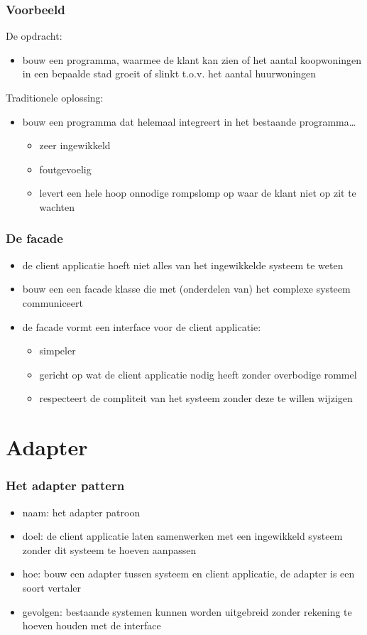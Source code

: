 \documentclass{beamer}
\begin{document}
\begin{frame} \frametitle{Voorbeeld}
  De opdracht:
  \begin{itemize}
  \item bouw een programma, waarmee de klant kan zien of het aantal koopwoningen in een bepaalde stad groeit of slinkt t.o.v. het aantal huurwoningen
  \end{itemize}
Traditionele oplossing:
\begin{itemize}
\item bouw een programma dat helemaal integreert in het bestaande programma\ldots
  \begin{itemize}
  \item zeer ingewikkeld
  \item foutgevoelig
  \item levert een hele hoop onnodige rompslomp op waar de klant niet op zit te wachten
  \end{itemize}
\end{itemize}
\end{frame}


\begin{frame} \frametitle{De facade}
  \begin{itemize}
\item de client applicatie hoeft niet alles van het ingewikkelde systeem te weten
\item bouw een een facade klasse die met (onderdelen van) het complexe systeem communiceert
\item de facade vormt een interface voor de client applicatie:
  \begin{itemize}
  \item simpeler
  \item gericht op wat de client applicatie nodig heeft zonder overbodige rommel
  \item respecteert de compliteit van het systeem zonder deze te willen wijzigen
  \end{itemize}
\end{itemize}
\end{frame}


\section{Adapter}


\begin{frame}[fragile]\frametitle{Het adapter pattern}
  \begin{itemize}
  \item naam: het adapter patroon
  \item doel: de client applicatie laten samenwerken met een ingewikkeld systeem zonder dit systeem te hoeven aanpassen
  \item hoe: bouw een adapter tussen systeem en client applicatie, de adapter is een soort vertaler
  \item gevolgen: bestaande systemen kunnen worden uitgebreid zonder rekening te hoeven houden met de interface
  \end{itemize}
\end{frame}
\end{document}
